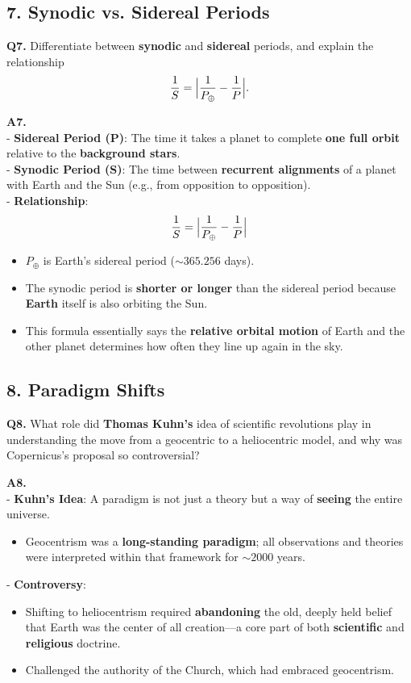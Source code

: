 \subsection*{7. Synodic vs. Sidereal Periods}

\textbf{Q7.} Differentiate between \textbf{synodic} and \textbf{sidereal} periods, and explain the relationship 
\[
\frac{1}{S} = \Bigl|\frac{1}{P_\oplus} - \frac{1}{P}\Bigr|.
\]

\textbf{A7.}\\
- \textbf{Sidereal Period (P)}: The time it takes a planet to complete \textbf{one full orbit} relative to the \textbf{background stars}.\\
- \textbf{Synodic Period (S)}: The time between \textbf{recurrent alignments} of a planet with Earth and the Sun (e.g., from opposition to opposition).\\
- \textbf{Relationship}:
  \[
    \frac{1}{S} = \Bigl|\frac{1}{P_\oplus} - \frac{1}{P}\Bigr|
  \]
  \begin{itemize}
    \item $P_\oplus$ is Earth’s sidereal period ($\sim 365.256$ days).
    \item The synodic period is \textbf{shorter or longer} than the sidereal period because \textbf{Earth} itself is also orbiting the Sun.
    \item This formula essentially says the \textbf{relative orbital motion} of Earth and the other planet determines how often they line up again in the sky.
  \end{itemize}

\subsection*{8. Paradigm Shifts}

\textbf{Q8.} What role did \textbf{Thomas Kuhn’s} idea of scientific revolutions play in understanding the move from a geocentric to a heliocentric model, and why was Copernicus’s proposal so controversial?

\textbf{A8.}\\
- \textbf{Kuhn’s Idea}: A paradigm is not just a theory but a way of \textbf{seeing} the entire universe.
  \begin{itemize}
    \item Geocentrism was a \textbf{long-standing paradigm}; all observations and theories were interpreted within that framework for $\sim 2000$ years.
  \end{itemize}
- \textbf{Controversy}:
  \begin{itemize}
    \item Shifting to heliocentrism required \textbf{abandoning} the old, deeply held belief that Earth was the center of all creation---a core part of both \textbf{scientific} and \textbf{religious} doctrine.
    \item Challenged the authority of the Church, which had embraced geocentrism.
  \end{itemize}

